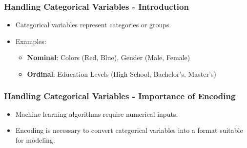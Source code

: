 \documentclass[aspectratio=169]{beamer}
\begin{document}
\begin{frame}[fragile]
    \frametitle{Handling Categorical Variables - Introduction}
    \begin{itemize}
        \item Categorical variables represent categories or groups.
        \item Examples:
        \begin{itemize}
            \item \textbf{Nominal}: Colors (Red, Blue), Gender (Male, Female)
            \item \textbf{Ordinal}: Education Levels (High School, Bachelor's, Master's)
        \end{itemize}
    \end{itemize}
\end{frame}

\begin{frame}[fragile]
    \frametitle{Handling Categorical Variables - Importance of Encoding}
    \begin{itemize}
        \item Machine learning algorithms require numerical inputs.
        \item Encoding is necessary to convert categorical variables into a format suitable for modeling.
    \end{itemize}
\end{frame}
\end{document}

